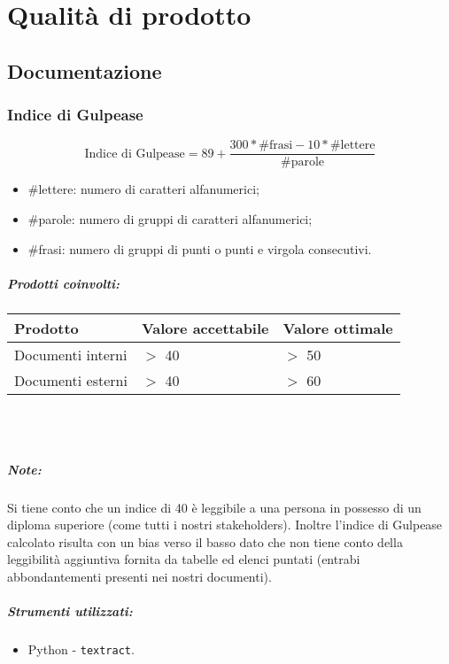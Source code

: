 \documentclass[a4paper, 12pt]{article}
\begin{document}
\makefrontpage

\makeversioni

\tableofcontents
\clearpage

\section{Qualità di prodotto}

\subsection{Documentazione}
\subsubsection{Indice di Gulpease}
\[ \text{Indice di Gulpease} = 89 + \frac{300*\text{\#frasi} - 10*\text{\#lettere}}{\text{\#parole}} \]
\begin{itemize}
	\item \#lettere: numero di caratteri alfanumerici;
	\item \#parole: numero di gruppi di caratteri alfanumerici;
	\item \#frasi: numero di gruppi di punti o punti e virgola consecutivi.
\end{itemize}

\subparagraph{Prodotti coinvolti:}
\begin{center}
	\begin{tabularx}{\textwidth}{|X|X|X|}
		\hline
		\textbf{Prodotto} & \textbf{Valore accettabile} & \textbf{Valore ottimale } \\
		\hline
		Documenti interni & $>$ 40                      & $>$ 50                    \\
		\hline
		Documenti esterni & $>$ 40                      & $>$ 60                    \\
		\hline
	\end{tabularx}\\[8pt]
	\mbox{}\\
\end{center}
\subparagraph{Note:}
Si tiene conto che un indice di 40 è leggibile a una persona in possesso di un diploma superiore (come tutti i nostri stakeholders).
Inoltre l'indice di Gulpease calcolato risulta con un bias verso il basso dato che non tiene conto della leggibilità aggiuntiva fornita da tabelle ed elenci puntati
(entrabi abbondantementi presenti nei nostri documenti).

\subparagraph{Strumenti utilizzati:}
\begin{itemize}
	\item Python - \texttt{textract}.
\end{itemize}
\end{document}
